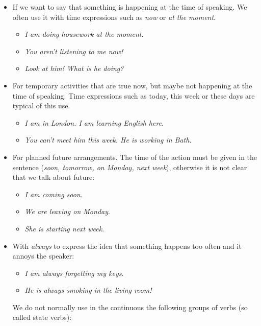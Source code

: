 \begin{itemize}

\item If we want to say that something is happening at the time of speaking. We often use it with time expressions such as \textit{now} or \textit{at the moment}.

\begin{itemize}
\item\textit{I am doing housework at the moment}.
\item\textit{You aren't listening to me now!}
\item\textit{Look at him! What is he doing?}
\end{itemize}

\item For temporary activities that are true now, but maybe not happening at the time of speaking. Time expressions such as today, this week or these days are typical of this use. 

\begin{itemize}
\item\textit{I am in London. I am learning English here}.
\item\textit{You can't meet him this week. He is working in Bath}.
\end{itemize}

\item  For planned future arrangements. The time of the action must be given in the sentence (\textit{soon, tomorrow, on Monday, next week}), otherwise it is not clear that we talk about future:

\begin{itemize}
\item\textit{I am coming soon}.
\item\textit{We are leaving on Monday}.
\item\textit{She is starting next week}.
\end{itemize}

\item With \textit{always} to express the idea that something happens too often and it annoys the speaker:

\begin{itemize}
\item\textit{I am always forgetting my keys}.
\item\textit{He is always smoking in the living room!}
\end{itemize}

We do not normally use in the continuous the following groups of verbs (so called state verbs):


\end{itemize}
